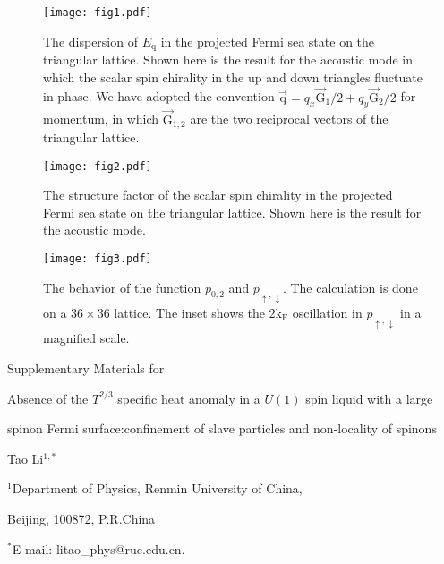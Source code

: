 \documentclass[12pt]{article}
\begin{document}
\clearpage

\begin{figure}[h!]
\texttt{[image: fig1.pdf]}
\caption{The dispersion of $E_{\mathrm{q}}$ in the projected Fermi sea state on the triangular lattice. Shown here is the result for the acoustic mode in which the scalar spin chirality in the up and down triangles fluctuate in phase. We have adopted the convention $\vec{\mathrm{q}}=q_{x}\vec{\mathrm{G}}_{1}/2+q_{y}\vec{\mathrm{G}}_{2}/2$ for momentum, in which $\vec{\mathrm{G}}_{1,2}$ are the two reciprocal vectors of the triangular lattice.}
\end{figure}


\begin{figure}[h!]
\texttt{[image: fig2.pdf]}
\caption{The structure factor of the scalar spin chirality in the projected Fermi sea state on the triangular lattice. Shown here is the result for the acoustic mode.}
\end{figure}

\begin{figure}[h!]
\texttt{[image: fig3.pdf]}
\caption{The behavior of the function $p_{0,2}$ and $p_{\uparrow,\downarrow}$. The calculation is done on a $36\times36$ lattice. The inset shows the $2\mathrm{k_{F}}$ oscillation in $p_{\uparrow,\downarrow}$ in a magnified scale.}
\end{figure}

\clearpage
\centerline{\LARGE{Supplementary Materials for}}
\vspace{0.5cm}
\centerline{\Large{Absence of the $T^{2/3}$ specific heat anomaly in a $U(1)$ spin liquid with a large}}
\centerline{\Large{spinon Fermi surface:confinement of slave particles and non-locality of spinons}}
\centerline{Tao Li$^{1,*}$}
\centerline{\normalsize{$^{1}$Department of Physics, Renmin University of China,}}
\centerline{\normalsize{Beijing, 100872, P.R.China}}
\centerline{\normalsize{$^{*}$E-mail:  litao\_phys@ruc.edu.cn.}}


\renewcommand\thefigure{S\arabic{figure}}
\vspace{1cm}
\clearpage

\setcounter{equation}{0}
\end{document}
